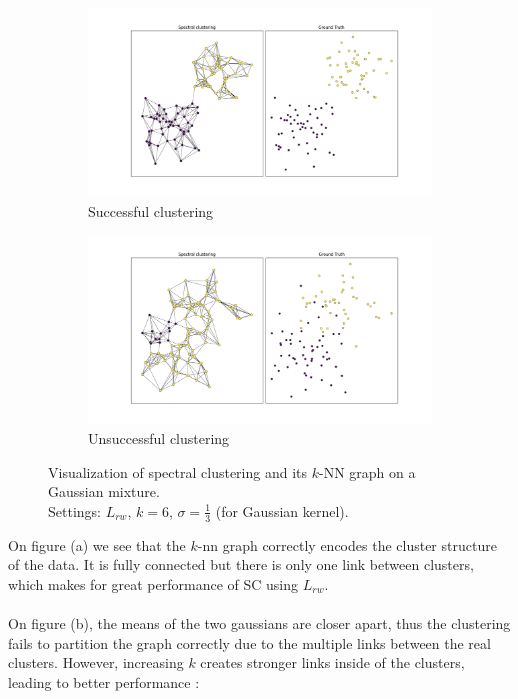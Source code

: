 \documentclass[a4paper,12pt]{article}
\theoremstyle{definition}
\theoremstyle{plain}
\begin{document}
\begin{figure}[H]
	\centering
	\captionsetup{justification=centering}
	\begin{subfigure}[b]{0.7\textwidth} %
		\centering
		\includegraphics[width=\linewidth]{figures/fig5_g1} %
		\caption{Successful clustering}
	\end{subfigure}
	\hspace{0.05\textwidth} %
	\begin{subfigure}[b]{0.7\textwidth} %
		\centering
		\includegraphics[width=\linewidth]{figures/fig6_g2} %
		\caption{Unsuccessful clustering}
	\end{subfigure}
	\caption{Visualization of spectral clustering and its $k$-NN graph on a Gaussian mixture. \\ Settings: $L_{rw}$, $k=6$, $\sigma=\frac{1}{3}$ (for Gaussian kernel).}
\end{figure}

On figure (a) we see that the $k$-nn graph correctly encodes the cluster structure of the data. It is fully connected but there is only one link between clusters, which makes for great performance of SC using $L_{rw}$. \\ \\
On figure (b), the means of the two gaussians are closer apart, thus the clustering fails to partition the graph correctly due to the multiple links between the real clusters.
\newpage
However, increasing $k$ creates stronger links inside of the clusters, leading to better performance :
 
\end{document}
